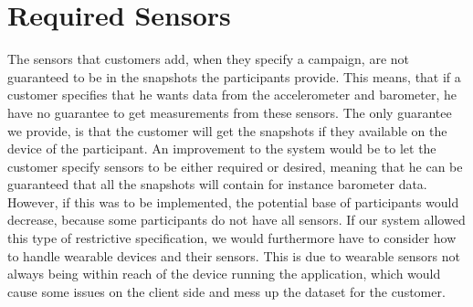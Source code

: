 
\section{Required Sensors}

The sensors that customers add, when they specify a campaign, are not guaranteed to be in the snapshots the participants provide. This means, that if a customer specifies that he wants data from the accelerometer and barometer, he have no guarantee to get measurements from these sensors. The only guarantee we provide, is that the customer will get the snapshots if they available on the device of the participant. An improvement to the system would be to let the customer specify sensors to be either required or desired, meaning that he can be guaranteed that all the snapshots will contain for instance barometer data. However, if this was to be implemented, the potential base of participants would decrease, because some participants do not have all sensors. If our system allowed this type of restrictive specification, we would furthermore have to consider how to handle wearable devices and their sensors. This is due to wearable sensors not always being within reach of the device running the application, which would cause some issues on the client side and mess up the dataset for the customer.   
